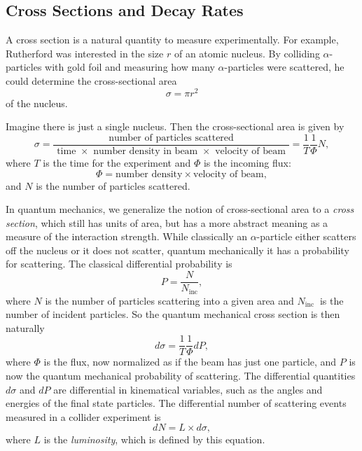 \subsection{Cross Sections and Decay Rates}
A cross section is a natural quantity to measure experimentally. 
For example, Rutherford was interested in the size $r$ of an atomic nucleus. 
By colliding $\alpha$-particles with gold foil and measuring how many $\alpha$-particles were scattered, he could determine the cross-sectional area
\begin{equation*}
	\sigma=\pi r^{2}
\end{equation*}
of the nucleus. 

Imagine there is just a single nucleus. Then the cross-sectional area is given by
\begin{equation}
	\sigma=\frac{\text { number of particles scattered }}{\text { time } \times \text { number density in beam } \times \text { velocity of beam }}=\frac{1}{T} \frac{1}{\Phi} N,
\end{equation}
where $T$ is the time for the experiment and $\Phi$ is the incoming flux:
\begin{equation*}
	\Phi= \text{number density} \times \text{velocity of beam},
\end{equation*}
and $N$ is the number of particles scattered.

In quantum mechanics, we generalize the notion of cross-sectional area to a \textit{cross section}, which still has units of area, but has a more abstract meaning as a measure of the interaction strength. 
While classically an $\alpha$-particle either scatters off the nucleus or it does not scatter, quantum mechanically it has a probability for scattering. 
The classical differential probability is 
\begin{equation*}
	P=\frac{N}{N_{\text{inc}}},
\end{equation*}
where $N$ is the number of particles scattering into a given area and $N_{\text {inc }}$ is the number of incident particles. 
So the quantum mechanical cross section is then naturally
\begin{equation}
	d \sigma=\frac{1}{T} \frac{1}{\Phi} d P,
\end{equation}
where $\Phi$ is the flux, now normalized as if the beam has just one particle, and $P$ is now the quantum mechanical probability of scattering. 
The differential quantities $d \sigma$ and $d P$ are differential in kinematical variables, such as the angles and energies of the final state particles. 
The differential number of scattering events measured in a collider experiment is
\begin{equation}
	d N=L \times d \sigma,
\end{equation}
where $L$ is the \textit{luminosity}, which is defined by this equation.

